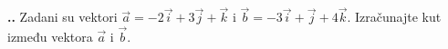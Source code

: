 
\noindent 
\textbf{
\thecjelina.\thezadatak.}
Zadani su vektori $\vec{a}=-2\vec{i}+3\vec{j}+\vec{k}$ i $\vec{b} = -3\vec{i}+\vec{j}+4\vec{k}$. 
Izračunajte kut između vektora  $\vec{a}$ i $\vec{b}$.
